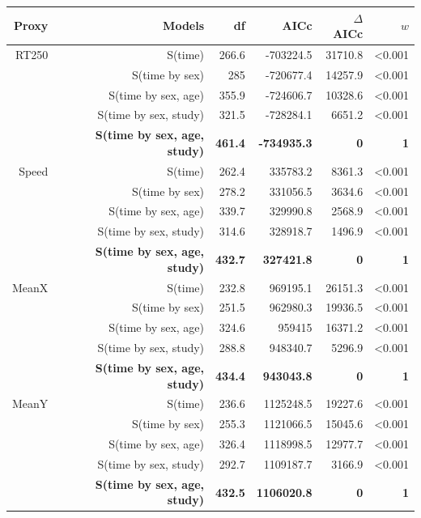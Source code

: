 \documentclass[a4paper,11pt]{article}
\begin{document}
\begin{table}[ht]
    \begin{tabular}{rrrrrr}
      \\
      \hline  
      Proxy & Models & df    & AICc  & $\Delta$AICc & $w$ \\
      \hline
      RT250 & S(time) & 266.6 & -703224.5 & 31710.8 & <0.001 \\
            & S(time by sex) & 285   & -720677.4 & 14257.9 & <0.001 \\
            & S(time by sex, age) & 355.9 & -724606.7 & 10328.6 & <0.001 \\
            & S(time by sex, study) & 321.5 & -728284.1 & 6651.2 & <0.001 \\
            & \textbf{S(time by sex, age, study)} & \textbf{461.4} & \textbf{-734935.3} & \textbf{0} & \textbf{1} \\        
      \hline
      Speed & S(time) & 262.4 & 335783.2 & 8361.3 & <0.001 \\
            & S(time by sex) & 278.2 & 331056.5 & 3634.6 & <0.001 \\
            & S(time by sex, age) & 339.7 & 329990.8 & 2568.9 & <0.001 \\
            & S(time by sex, study) & 314.6 & 328918.7 & 1496.9 & <0.001 \\
            & \textbf{S(time by sex, age, study)} & \textbf{432.7} & \textbf{327421.8} & \textbf{0} & \textbf{1} \\
      \hline
     MeanX & S(time) & 232.8 & 969195.1 & 26151.3 & <0.001 \\
          & S(time by sex) & 251.5 & 962980.3 & 19936.5 & <0.001 \\
          & S(time by sex, age) & 324.6 & 959415 & 16371.2 & <0.001 \\
          & S(time by sex, study) & 288.8 & 948340.7 & 5296.9 & <0.001 \\
          & \textbf{S(time by sex, age, study)} & \textbf{434.4} & \textbf{943043.8} & \textbf{0}     & \textbf{1} \\ 
      \hline
      MeanY & S(time) & 236.6 & 1125248.5 & 19227.6 & <0.001 \\
          & S(time by sex) & 255.3 & 1121066.5 & 15045.6 & <0.001 \\
          & S(time by sex, age) & 326.4 & 1118998.5 & 12977.7 & <0.001 \\
          & S(time by sex, study) & 292.7 & 1109187.7 & 3166.9 & <0.001 \\
          & \textbf{S(time by sex, age, study)} & \textbf{432.5} & \textbf{1106020.8} & \textbf{0}     & \textbf{1} \\
      \hline 
    \end{tabular}
  \end{table}
  
\end{document}
